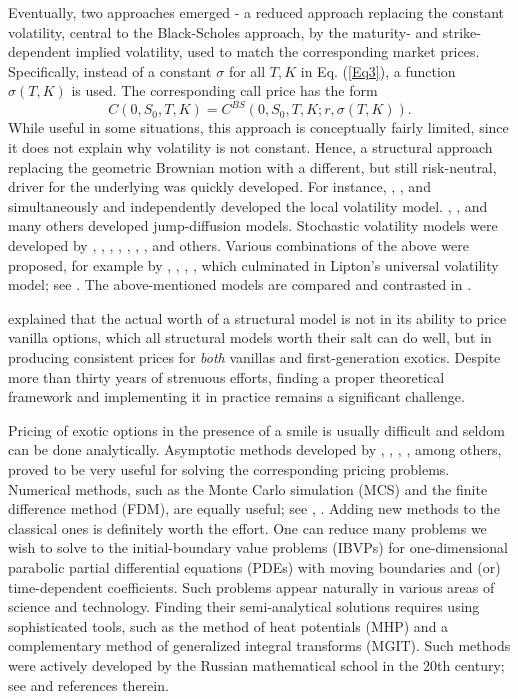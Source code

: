 \documentclass{article}
\begin{document}
Eventually, two approaches emerged - a reduced approach replacing the
constant volatility, central to the Black-Scholes approach, by the maturity-
and strike-dependent implied volatility, used to match the corresponding
market prices. Specifically, instead of a constant $\sigma $ for all $T,K$
in Eq. (\ref{Eq3}), a function $\sigma \left( T,K\right) $ is used. The
corresponding call price has the form%
\begin{equation}
C(0,S_{0},T,K)=C^{BS}(0,S_{0},T,K;r,\sigma \left( T,K\right) ).  \label{Eq4}
\end{equation}%
While useful in some situations, this approach is conceptually fairly
limited, since it does not explain why volatility is not constant. Hence, a
structural approach replacing the geometric Brownian motion with a
different, but still risk-neutral, driver for the underlying was quickly
developed. For instance, \cite{Derman1994}, \cite{Dupire1994}, and \cite%
{Rubinstein1994} simultaneously and independently developed the local
volatility model. \cite{Merton1976}, \cite{Andersen2000}, \cite{Lewis2001}
and many others developed jump-diffusion models. Stochastic volatility
models were developed by \cite{Hull1987}, \cite{Scott1987}, \cite%
{Wiggins1987}, \cite{Stein1991}, \cite{Heston1993}, \cite{Lewis2000}, \cite%
{Bergomi2015}, and others. Various combinations of the above were proposed,
for example by \cite{Dupire1996}, \cite{Jex1999}, \cite{Hagan2002}, \cite%
{Lipton2002a}, which culminated in Lipton's universal volatility model; see 
\cite{Lipton2002a}. The above-mentioned models are compared and contrasted
in \cite{Lipton2002a}.

\cite{Lipton2002b} explained that the actual worth of a structural model is
not in its ability to price vanilla options, which all structural models
worth their salt can do well, but in producing consistent prices for \emph{%
both} vanillas and first-generation exotics. Despite more than thirty years
of strenuous efforts, finding a proper theoretical framework and
implementing it in practice remains a significant challenge.

Pricing of exotic options in the presence of a smile is usually difficult
and seldom can be done analytically. Asymptotic methods developed by \cite%
{Hull1987}, \cite{Hagan2002}, \cite{Lipton1997}, \cite{Lipton2001}, among
others, proved to be very useful for solving the corresponding pricing
problems. Numerical methods, such as the Monte Carlo simulation (MCS) and
the finite difference method (FDM), are equally useful; see \cite%
{Glasserman2004}, \cite{Achdou2005}. Adding new methods to the classical
ones is definitely worth the effort. One can reduce many problems we wish to
solve to the initial-boundary value problems (IBVPs) for one-dimensional
parabolic partial differential equations (PDEs) with moving boundaries and
(or) time-dependent coefficients. Such problems appear naturally in various
areas of science and technology. Finding their semi-analytical solutions
requires using sophisticated tools, such as the method of heat potentials
(MHP) and a complementary method of generalized integral transforms (MGIT).
Such methods were actively developed by the Russian mathematical school in
the 20th century; see \cite{Kartashov2001} and references therein.
\end{document}
